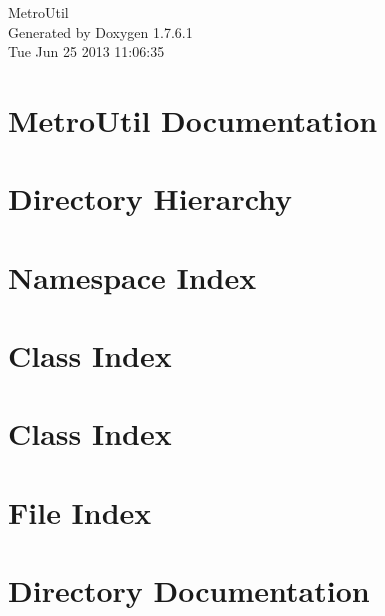 \documentclass[a4paper]{book}
\begin{document}
\hypersetup{pageanchor=false,citecolor=blue}
\begin{titlepage}
\vspace*{7cm}
\begin{center}
{\Large \-Metro\-Util }\\
\vspace*{1cm}
{\large \-Generated by Doxygen 1.7.6.1}\\
\vspace*{0.5cm}
{\small Tue Jun 25 2013 11:06:35}\\
\end{center}
\end{titlepage}
\clearemptydoublepage
{}
\tableofcontents
\clearemptydoublepage
{}
\hypersetup{pageanchor=true,citecolor=blue}
\chapter{\-Metro\-Util \-Documentation}
\label{index}\hypertarget{index}{}
\chapter{\-Directory \-Hierarchy}

\chapter{\-Namespace \-Index}

\chapter{\-Class \-Index}

\chapter{\-Class \-Index}

\chapter{\-File \-Index}

\chapter{\-Directory \-Documentation}








\end{document}
